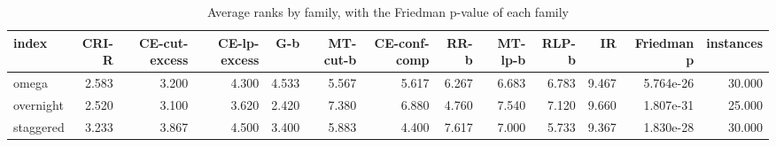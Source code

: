 \begin{table}[htbp]
\centering
\small
\caption{Average ranks by family, with the Friedman p-value of each family}
\label{tab:E2b_head_to_head_budgets_b1_ranks_by_family}
\begin{tabular}{lrrrrrrrrrrrr}
\toprule
index & CRI-R & CE-cut-excess & CE-lp-excess & G-b & MT-cut-b & CE-conf-comp & RR-b & MT-lp-b & RLP-b & IR & Friedman p & instances \\
\midrule
omega & 2.583 & 3.200 & 4.300 & 4.533 & 5.567 & 5.617 & 6.267 & 6.683 & 6.783 & 9.467 & 5.764e-26 & 30.000 \\
overnight & 2.520 & 3.100 & 3.620 & 2.420 & 7.380 & 6.880 & 4.760 & 7.540 & 7.120 & 9.660 & 1.807e-31 & 25.000 \\
staggered & 3.233 & 3.867 & 4.500 & 3.400 & 5.883 & 4.400 & 7.617 & 7.000 & 5.733 & 9.367 & 1.830e-28 & 30.000 \\
\bottomrule
\end{tabular}
\end{table}
